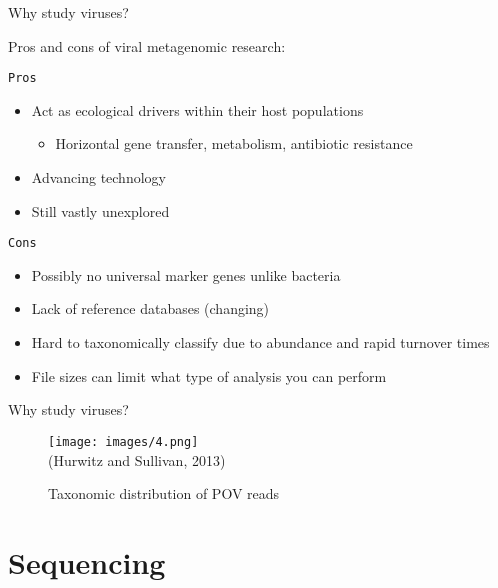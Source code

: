 \documentclass{beamer}
\begin{document}
\begin{frame}{Why study viruses?}

Pros and cons of viral metagenomic research:
\begin{block}{\texttt{Pros}}
\begin{itemize}
  \item Act as ecological drivers within their host populations
  	\begin{itemize}
  		\item Horizontal gene transfer, metabolism, antibiotic resistance
  	\end{itemize}
  \item Advancing technology
  \item Still vastly unexplored 
\end{itemize}

\end{block}
\begin{block}{\texttt{Cons}}

\begin{itemize}
  \item Possibly no universal marker genes unlike bacteria
  \item Lack of reference databases (changing)
  \item Hard to taxonomically classify due to abundance and rapid turnover times
  \item File sizes can limit what type of analysis you can perform
\end{itemize}

\end{block}

\end{frame}

\begin{frame}{Why study viruses?}

\begin{figure}
\centering
\texttt{[image: images/4.png]}\\[-1ex]
{\tiny (Hurwitz and Sullivan, 2013)}
\caption{Taxonomic distribution of POV reads}
\label{fig:2}
\end{figure}

\end{frame}

\section{Sequencing}
\end{document}
